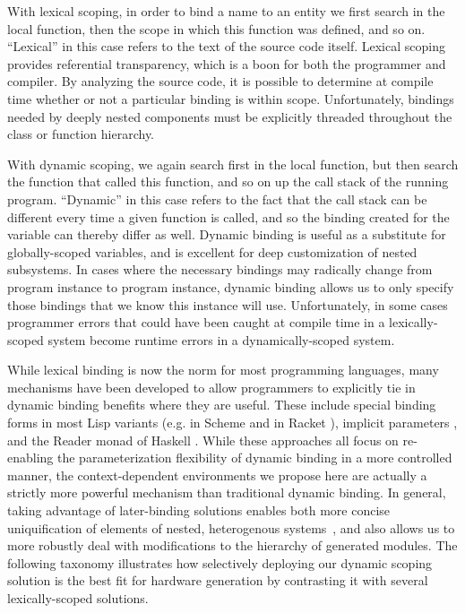 With lexical scoping, in order to bind a name to an entity we first search in the local function, then the scope in which this function was defined, and so on.
``Lexical'' in this case refers to the text of the source code itself.
Lexical scoping provides referential transparency, which is a boon for both the programmer and compiler.
By analyzing the source code, it is possible to determine at compile time whether or not a particular binding is within scope.
Unfortunately, bindings needed by deeply nested components must be explicitly threaded throughout the class or function hierarchy.

With dynamic scoping, we again search first in the local function, but then search the function that called this function, and so on up the call stack of the running program.
``Dynamic'' in this case refers to the fact that the call stack can be different every time a given function is called, and so the binding created for the variable can thereby differ as well.
Dynamic binding is useful as a substitute for globally-scoped variables, and is excellent for deep customization of nested subsystems.
In cases where the necessary bindings may radically change from program instance to program instance, dynamic binding allows us to only specify those bindings that we know this instance will use.
Unfortunately, in some cases programmer errors that could have been caught at compile time in a lexically-scoped system become runtime errors in a dynamically-scoped system.

While lexical binding is now the norm for most programming languages, many mechanisms have been developed to allow programmers to explicitly tie in dynamic binding benefits where they are useful.
These include special binding forms in most Lisp variants
(e.g.  in Scheme \cite{steele} and  in Racket \cite{flatt2013racket}),
implicit parameters \cite{lewis2000implicit}, and the Reader monad of Haskell \cite{jones1995functional}.
While these approaches all focus on re-enabling the parameterization flexibility of dynamic binding in a more controlled manner, 
the context-dependent environments we propose here are actually a strictly more powerful mechanism than traditional dynamic binding. 
In general, taking advantage of later-binding solutions enables both more concise uniquification of elements of nested, heterogenous systems~\cite{shacham2011chip},
and also allows us to more robustly deal with modifications to the hierarchy of generated modules.
The following taxonomy illustrates how selectively deploying our dynamic scoping solution is the best fit for hardware generation
by contrasting it with several lexically-scoped solutions.

